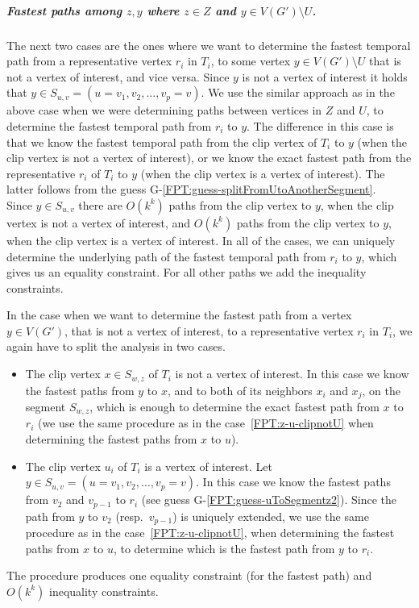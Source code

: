 \documentclass[a4paper,UKenglish,cleveref, autoref, thm-restate]{lipics-v2021}
\begin{document}
\subparagraph{\boldmath Fastest paths among $z,y$ where $z \in Z$ and $y \in V(G') \setminus U$.}
The next two cases are the ones where we want to determine the fastest temporal path from a representative vertex $r_i$ in $T_i$, to some vertex $y \in V(G') \setminus U$ that is not a vertex of interest,
and vice versa.
Since $y$ is not a vertex of interest it holds that $y \in S_{u,v}=(u = v_1, v_2, \dots, v_p = v)$. %
We use the similar approach as in the above case when we were determining paths between vertices in $Z$ and $U$, 
to determine the fastest temporal path from $r_i$ to $y$. 
The difference in this case is that 
we know the fastest temporal path from the clip vertex of $T_i$ to $y$
(when the clip vertex is not a vertex of interest),
or we know the exact fastest path from the representative $r_i$ of $T_i$ to $y$
(when the clip vertex is a vertex of interest).
The latter follows from the guess G-\ref{FPT:guess-splitFromUtoAnotherSegment}.\\
%
Since $y \in S_{u,v}$ there are $O(k^{k})$ paths from the clip vertex to $y$, when the clip vertex is not a vertex of interest,
and $O(k^{k})$ paths from the clip vertex to $y$, when the clip vertex is a vertex of interest.
In all of the cases, we can uniquely determine the underlying path of the fastest temporal path from $r_i$ to $y$, which gives us an equality constraint.
For all other paths we add the inequality constraints. 

In the case when we want to determine the fastest path from a vertex $y \in V(G')$, that is not a vertex of interest,
to a representative vertex $r_i$ in $T_i$, 
we 
again have to split the analysis in two cases. 
\begin{itemize}
    \item The clip vertex $x \in S_{w,z}$ of $T_i$ is not a vertex of interest.
In this case we
know the fastest paths from $y$ to $x$, and to both of its neighbors $x_{i}$ and $x_{j}$, on the segment $S_{w,z}$,
which is enough to determine the exact fastest path from $x$ to $r_i$ 
(we use the same procedure as in the case~\ref{FPT:z-u-clipnotU} when determining the fastest paths from $x$ to $u$). 
    \item The clip vertex $u_i$ of $T_i$ is a vertex of interest.
Let $y \in S_{u,v} = (u = v_1,v_2, \dots, v_p = v)$.
In this case we know the fastest paths from $v_2$ and $v_{p-1}$ to $r_i$ (see guess G-\ref{FPT:guess-uToSegmentz2}).
Since the path from $y$ to $v_2$ (resp.~$v_{p-1}$) is uniquely extended, 
we use the same procedure as in the 
case~\ref{FPT:z-u-clipnotU}, when determining the fastest paths from $x$ to $u$,
to determine which is the fastest path from $y$ to $r_i$.
\end{itemize}
The procedure produces one equality constraint (for the fastest path) and $O(k^k)$ inequality constraints.
\end{document}
